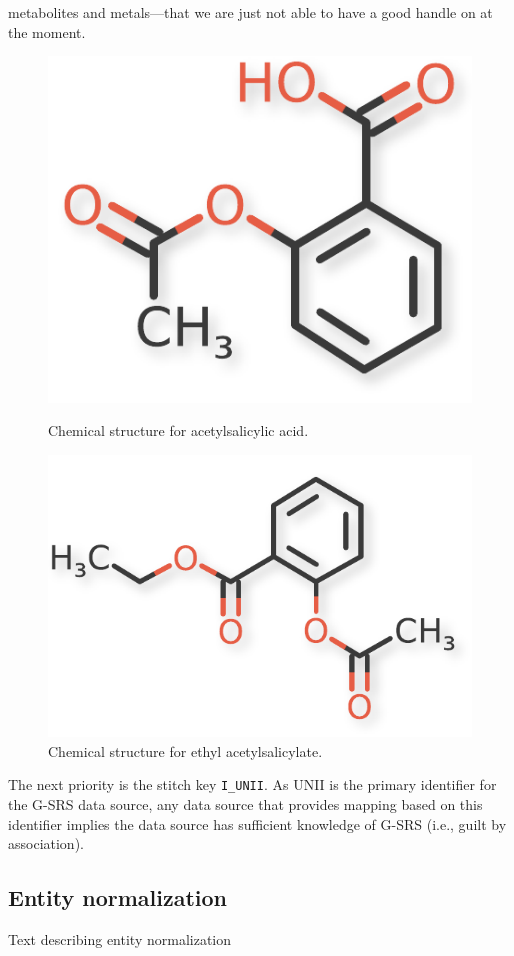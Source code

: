 \documentclass{bioinfo}
\begin{document}
\begin{methods}
metabolites and metals---that we are just not able to have a good
handle on at the moment.
\begin{figure}[!tpb]
\centering
\begin{minipage}{.45\textwidth}
\centerline{\includegraphics[scale=0.5]{aspirin-crop}}
\caption{Chemical structure for acetylsalicylic
acid.}\label{fig:aspirin}
\end{minipage}
\hfill
\begin{minipage}{.45\textwidth}
\centerline{\includegraphics[scale=0.5]{VX19C5613T-crop}}
\caption{Chemical structure for ethyl acetylsalicylate.}\label{fig:ethyl}
\end{minipage}
\end{figure}

The next priority is the stitch key \texttt{I\_UNII}. As UNII is
the primary identifier for the G-SRS data source, any data source that
provides mapping based on this identifier implies the data source has
sufficient knowledge of G-SRS (i.e., guilt by association).

\subsection{Entity normalization}
Text describing entity normalization

\end{methods}
\end{document}
